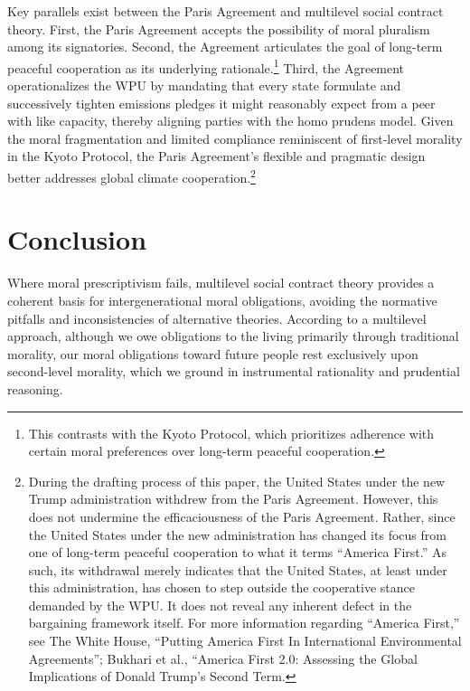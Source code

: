 \documentclass[12pt, a4paper, twoside]{article}
\begin{document}
Key parallels exist between the Paris Agreement and multilevel social contract theory. First, the Paris Agreement accepts the possibility of moral pluralism among its signatories. Second, the Agreement articulates the goal of long-term peaceful cooperation as its underlying rationale.\footnote{This contrasts with the Kyoto Protocol, which prioritizes adherence with certain moral preferences over long-term peaceful cooperation.} Third, the Agreement operationalizes the WPU by mandating that every state formulate and successively tighten emissions pledges it might reasonably expect from a peer with like capacity, thereby aligning parties with the homo prudens model. Given the moral fragmentation and limited compliance reminiscent of first-level morality in the Kyoto Protocol, the Paris Agreement’s flexible and pragmatic design better addresses global climate cooperation.\footnote{During the drafting process of this paper, the United States under the new Trump administration withdrew from the Paris Agreement. However, this does not undermine the efficaciousness of the Paris Agreement. Rather, since the United States under the new administration has changed its focus from one of long-term peaceful cooperation to what it terms “America First.” As such, its withdrawal merely indicates that the United States, at least under this administration, has chosen to step outside the cooperative stance demanded by the WPU. It does not reveal any inherent defect in the bargaining framework itself. For more information regarding “America First,” see The White House, “Putting America First In International Environmental Agreements”; Bukhari et al., “America First 2.0: Assessing the Global Implications of Donald Trump's Second Term.}

\section{Conclusion}

Where moral prescriptivism fails, multilevel social contract theory provides a coherent basis for intergenerational moral obligations, avoiding the normative pitfalls and inconsistencies of alternative theories. According to a multilevel approach, although we owe obligations to the living primarily through traditional morality, our moral obligations toward future people rest exclusively upon second-level morality, which we ground in instrumental rationality and prudential reasoning.


\printbibliography
\end{document}
